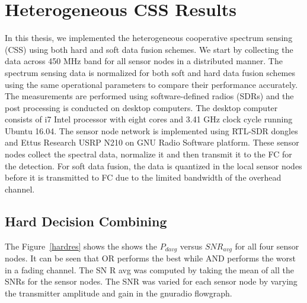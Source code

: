 \section{Heterogeneous CSS Results}
In this thesis, we implemented the heterogeneous cooperative spectrum sensing (CSS) using both hard and soft data fusion schemes. We start by collecting the data across 450 MHz band for all sensor nodes in a distributed manner. The spectrum sensing data is normalized for both soft and hard data fusion schemes using the same operational parameters to compare their performance accurately. The measurements are performed using software-defined radios (SDRs) and the post processing is conducted on desktop computers. The desktop computer consists of i7 Intel processor with eight cores and 3.41 GHz clock cycle running Ubuntu 16.04. The sensor node network is implemented using RTL-SDR dongles and Ettus Research USRP N210 on GNU Radio Software platform.
These sensor nodes collect the spectral data, normalize it and then transmit it to the FC for the detection. For soft data fusion, the data is quantized in the local sensor nodes before it is transmitted to FC due to the limited bandwidth of the overhead channel. 

\subsection{Hard Decision Combining}
The Figure~\ref{hardres} shows the shows the $P_{davg}$ versus $SNR_{avg}$ for all four sensor nodes. It can be seen that OR performs the best while AND performs
the worst in a fading channel. The SN R avg was computed by taking the mean of all the SNRs for the sensor nodes. The SNR
was varied for each sensor node by varying the transmitter amplitude and gain in the gnuradio flowgraph.

